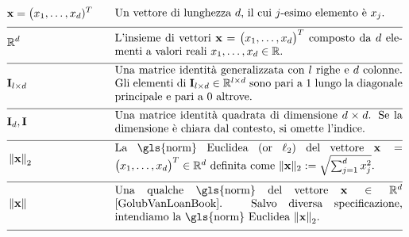 \begin{align} 
	 &\featurevec=\big(\feature_{1},\ldots,\feature_{\featuredim})^{T} &\quad & \parbox{.75\textwidth}{Un vettore di lunghezza $\featuredim$, il cui
		$\featureidx$-esimo elemento è $\feature_{\featureidx}$.} \nonumber \\[2mm] \hline \nonumber\\[-5mm]
	&\mathbb{R}^{\featuredim} & \quad &  \parbox{.75\textwidth}{L'insieme di vettori $\featurevec=\big(\feature_{1},\ldots,\feature_{\featurelen}\big)^{T}$ composto da $\featuredim$ elementi a valori reali $\feature_{1},\ldots,\feature_{\featurelen} \in \mathbb{R}$.} \nonumber \\[2mm] \hline \nonumber\\[-5mm]
	&\mathbf{I}_{\modelidx \times \featuredim}  & \quad &  \parbox{.75\textwidth}{Una matrice identità generalizzata con $\modelidx$ righe e $\featuredim$ colonne. Gli elementi di $\mathbf{I}_{\modelidx \times \featuredim} \in \mathbb{R}^{\modelidx \times \featuredim}$ 
		sono pari a $1$ lungo la diagonale principale e pari a $0$ altrove. }\nonumber \\[2mm] \hline \nonumber\\[-5mm] %
	&\mathbf{I}_{\dimlocalmodel}, \mathbf{I} & \quad &  \parbox{.75\textwidth}{Una matrice identità quadrata di dimensione $\dimlocalmodel \times \dimlocalmodel$. Se la dimensione è chiara dal contesto, si omette l'indice.} \nonumber \\[2mm] \hline \nonumber\\[-5mm]
	&\normgeneric{\featurevec}{2}  &\quad & \parbox{.75\textwidth}{La \gls{norm} Euclidea (or $\ell_{2}$) del vettore 
		$\featurevec=\big(\feature_{1},\ldots,\feature_{\featurelen}\big)^{T} \in \mathbb{R}^{\featuredim}$ definita come $ \| \featurevec \|_{2} \defeq \sqrt{\sum_{\featureidx=1}^{\featuredim} \feature_{\featureidx}^{2}}$.} \nonumber \\[2mm] \hline \nonumber\\[-5mm] 
	&\normgeneric{\featurevec}{}  & \quad &  \parbox{.75\textwidth}{Una qualche \gls{norm} del vettore $\featurevec \in \mathbb{R}^{\featuredim}$ \cite{GolubVanLoanBook}. Salvo diversa specificazione, intendiamo la \gls{norm} Euclidea $\normgeneric{\featurevec}{2}$.} \nonumber \\[2mm] \hline \nonumber\\[-5mm]

\end{align}
